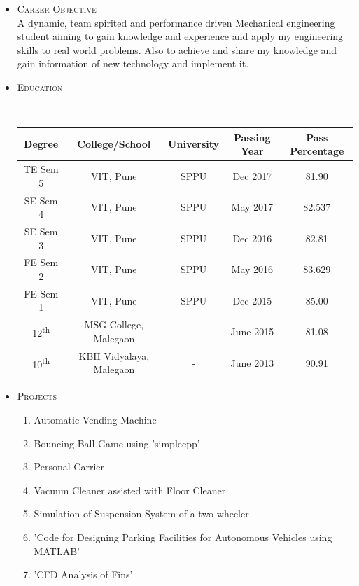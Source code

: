 \documentclass[10pt]{article}
\begin{document}
\begin{itemize}
	\bigskip
	\item  \LARGE{\textsc{Career Objective}} \\
	\small{A dynamic, team spirited and performance driven Mechanical engineering student aiming to gain knowledge and experience and apply my engineering skills to real world problems. Also to achieve and share my knowledge and gain information of new technology and implement it.} \\


\bigskip
\item \begin{LARGE}
	\textsc{Education}
\end{LARGE} \\

\begin{tabular}{||c|c|c|c|c||}
	\hline
	
	Degree & College/School & University & Passing Year & Pass Percentage \\ 
	\hline
	TE Sem 5 & VIT, Pune & SPPU & Dec 2017 & 81.90\\\hline
	SE Sem 4 & VIT, Pune & SPPU & May 2017 & 82.537\\\hline
	SE Sem 3 & VIT, Pune & SPPU & Dec 2016 & 82.81\\\hline
	FE Sem 2 & VIT, Pune & SPPU & May 2016 & 83.629\\\hline
	FE Sem 1 & VIT, Pune & SPPU & Dec 2015 & 85.00\\\hline
	12\textsuperscript{th} & MSG College, Malegaon & - & June 2015 & 81.08 \\
	\hline10\textsuperscript{th} & KBH Vidyalaya, Malegaon & - & June 2013 & 90.91 \\\hline
\end{tabular}



\bigskip
\item \LARGE{\textsc{Projects}}
\begin{small}
	\begin{enumerate}
		\itemsep0em
		\item Automatic Vending Machine
		\item Bouncing Ball Game using 'simplecpp'
		\item Personal Carrier
		\item Vacuum Cleaner assisted with Floor Cleaner
		\item Simulation of Suspension System of a two wheeler 	
		\item 'Code for Designing Parking Facilities for Autonomous Vehicles using MATLAB'
		\item 'CFD Analysis of Fins' 
	\end{enumerate}


\end{small}
\end{itemize}
\end{document}
